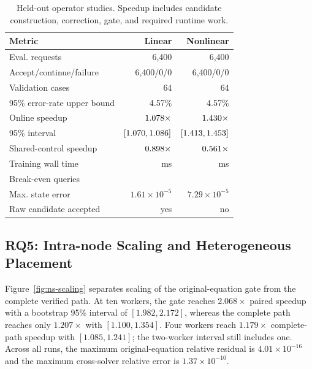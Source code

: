 \begin{table}[t]
\centering
\footnotesize
\caption{Held-out operator studies. Speedup includes candidate construction,
correction, gate, and required runtime work.}
\label{tab:operators}
\begin{tabular}{lrr}
\toprule
Metric & Linear & Nonlinear \\
\midrule
Eval. requests & 6,400 & 6,400 \\
Accept/continue/failure & 6,400/0/0 & 6,400/0/0 \\
Validation cases & 64 & 64 \\
95\% error-rate upper bound & 4.57\% & 4.57\% \\
Online speedup & $1.078\times$ & $1.430\times$ \\
95\% interval & $[1.070,1.086]$ & $[1.413,1.453]$ \\
Shared-control speedup & $0.898\times$ & $0.561\times$ \\
Training wall time & \LinearOperatorTrainingMs{} ms & \NonlinearOperatorTrainingMs{} ms \\
Break-even queries & \LinearOperatorBreakEven{} & \NonlinearOperatorBreakEven{} \\
Max. state error & $1.61\times10^{-5}$ & $7.29\times10^{-5}$ \\
Raw candidate accepted & yes & no \\
\bottomrule
\end{tabular}
\end{table}

\subsection{RQ5: Intra-node Scaling and Heterogeneous Placement}

Figure~\ref{fig:ns-scaling} separates scaling of the original-equation gate from
the complete verified path. At ten workers, the gate reaches $2.068\times$ paired
speedup with a bootstrap 95\% interval of $[1.982,2.172]$, whereas the complete
path reaches only $1.207\times$ with $[1.100,1.354]$. Four workers reach
$1.179\times$ complete-path speedup with $[1.085,1.241]$; the two-worker interval
still includes one. Across all runs, the maximum original-equation relative
residual is $4.01\times10^{-16}$ and the maximum cross-solver relative error is
$1.37\times10^{-10}$.

